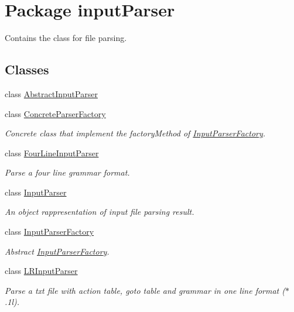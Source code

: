 \hypertarget{namespaceinput_parser}{\section{Package input\-Parser}
\label{namespaceinput_parser}
}


Contains the class for file parsing.  


\subsection*{Classes}
\begin{DoxyCompactItemize}
\item 
class \hyperlink{classinput_parser_1_1_abstract_input_parser}{Abstract\-Input\-Parser}
\item 
class \hyperlink{classinput_parser_1_1_concrete_parser_factory}{Concrete\-Parser\-Factory}
\begin{DoxyCompactList}\small\item\em Concrete class that implement the factory\-Method of \hyperlink{classinput_parser_1_1_input_parser_factory}{Input\-Parser\-Factory}. \end{DoxyCompactList}\item 
class \hyperlink{classinput_parser_1_1_four_line_input_parser}{Four\-Line\-Input\-Parser}
\begin{DoxyCompactList}\small\item\em Parse a four line grammar format. \end{DoxyCompactList}\item 
class \hyperlink{classinput_parser_1_1_input_parser}{Input\-Parser}
\begin{DoxyCompactList}\small\item\em An object rappresentation of input file parsing result. \end{DoxyCompactList}\item 
class \hyperlink{classinput_parser_1_1_input_parser_factory}{Input\-Parser\-Factory}
\begin{DoxyCompactList}\small\item\em Abstract \hyperlink{classinput_parser_1_1_input_parser_factory}{Input\-Parser\-Factory}. \end{DoxyCompactList}\item 
class \hyperlink{classinput_parser_1_1_l_r_input_parser}{L\-R\-Input\-Parser}
\begin{DoxyCompactList}\small\item\em Parse a txt file with action table, goto table and grammar in one line format ($\ast$.1l). \end{DoxyCompactList}\item 

\end{DoxyCompactItemize}
